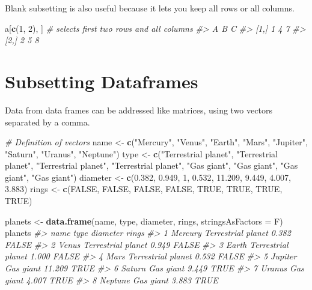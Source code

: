 \documentclass[]{book}
\newenvironment{Shaded}{\begin{snugshade}}{\end{snugshade}}
\newcommand{\KeywordTok}[1]{\textcolor[rgb]{0.13,0.29,0.53}{\textbf{#1}}}
\newcommand{\DataTypeTok}[1]{\textcolor[rgb]{0.13,0.29,0.53}{#1}}
\newcommand{\DecValTok}[1]{\textcolor[rgb]{0.00,0.00,0.81}{#1}}
\newcommand{\FloatTok}[1]{\textcolor[rgb]{0.00,0.00,0.81}{#1}}
\newcommand{\StringTok}[1]{\textcolor[rgb]{0.31,0.60,0.02}{#1}}
\newcommand{\CommentTok}[1]{\textcolor[rgb]{0.56,0.35,0.01}{\textit{#1}}}
\newcommand{\OtherTok}[1]{\textcolor[rgb]{0.56,0.35,0.01}{#1}}
\newcommand{\NormalTok}[1]{#1}
\begin{document}
Blank subsetting is also useful because it lets you keep all rows or all
columns.

\begin{Shaded}
\begin{Highlighting}[]
\NormalTok{a[}\KeywordTok{c}\NormalTok{(}\DecValTok{1}\NormalTok{, }\DecValTok{2}\NormalTok{), ] }\CommentTok{# selects first two rows and all columns}
\CommentTok{#>      A B C}
\CommentTok{#> [1,] 1 4 7}
\CommentTok{#> [2,] 2 5 8}
\end{Highlighting}
\end{Shaded}

\section{Subsetting Dataframes}\label{subsetting-dataframes}

Data from data frames can be addressed like matrices, using two vectors
separated by a comma.

\begin{Shaded}
\begin{Highlighting}[]
\CommentTok{# Definition of vectors}
\NormalTok{name <-}\StringTok{ }\KeywordTok{c}\NormalTok{(}\StringTok{"Mercury"}\NormalTok{, }\StringTok{"Venus"}\NormalTok{, }\StringTok{"Earth"}\NormalTok{, }\StringTok{"Mars"}\NormalTok{, }\StringTok{"Jupiter"}\NormalTok{, }\StringTok{"Saturn"}\NormalTok{, }\StringTok{"Uranus"}\NormalTok{, }\StringTok{"Neptune"}\NormalTok{)}
\NormalTok{type <-}\StringTok{ }\KeywordTok{c}\NormalTok{(}\StringTok{"Terrestrial planet"}\NormalTok{, }\StringTok{"Terrestrial planet"}\NormalTok{, }\StringTok{"Terrestrial planet"}\NormalTok{, }\StringTok{"Terrestrial planet"}\NormalTok{, }\StringTok{"Gas giant"}\NormalTok{, }\StringTok{"Gas giant"}\NormalTok{, }\StringTok{"Gas giant"}\NormalTok{, }\StringTok{"Gas giant"}\NormalTok{)}
\NormalTok{diameter <-}\StringTok{ }\KeywordTok{c}\NormalTok{(}\FloatTok{0.382}\NormalTok{, }\FloatTok{0.949}\NormalTok{, }\DecValTok{1}\NormalTok{, }\FloatTok{0.532}\NormalTok{, }\FloatTok{11.209}\NormalTok{, }\FloatTok{9.449}\NormalTok{, }\FloatTok{4.007}\NormalTok{, }\FloatTok{3.883}\NormalTok{)}
\NormalTok{rings <-}\StringTok{ }\KeywordTok{c}\NormalTok{(}\OtherTok{FALSE}\NormalTok{, }\OtherTok{FALSE}\NormalTok{, }\OtherTok{FALSE}\NormalTok{, }\OtherTok{FALSE}\NormalTok{, }\OtherTok{TRUE}\NormalTok{, }\OtherTok{TRUE}\NormalTok{, }\OtherTok{TRUE}\NormalTok{, }\OtherTok{TRUE}\NormalTok{)}

\NormalTok{planets <-}\StringTok{ }\KeywordTok{data.frame}\NormalTok{(name, type, diameter, rings, }\DataTypeTok{stringsAsFactors =}\NormalTok{ F)}
\NormalTok{planets}
\CommentTok{#>      name               type diameter rings}
\CommentTok{#> 1 Mercury Terrestrial planet    0.382 FALSE}
\CommentTok{#> 2   Venus Terrestrial planet    0.949 FALSE}
\CommentTok{#> 3   Earth Terrestrial planet    1.000 FALSE}
\CommentTok{#> 4    Mars Terrestrial planet    0.532 FALSE}
\CommentTok{#> 5 Jupiter          Gas giant   11.209  TRUE}
\CommentTok{#> 6  Saturn          Gas giant    9.449  TRUE}
\CommentTok{#> 7  Uranus          Gas giant    4.007  TRUE}
\CommentTok{#> 8 Neptune          Gas giant    3.883  TRUE}
\end{Highlighting}
\end{Shaded}
\end{document}
